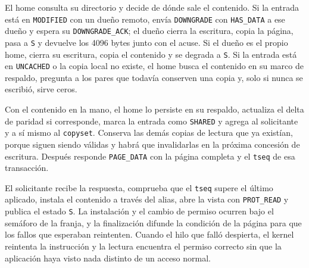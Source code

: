 El home consulta su directorio y decide de dónde sale el contenido. Si la entrada está en \texttt{MODIFIED} con un dueño remoto, envía \texttt{DOWNGRADE} con \texttt{HAS\_DATA} a ese dueño y espera su \texttt{DOWNGRADE\_ACK}; el dueño cierra la escritura, copia la página, pasa a \texttt{S} y devuelve los 4096 bytes junto con el acuse. Si el dueño es el propio home, cierra su escritura, copia el contenido y se degrada a \texttt{S}. Si la entrada está en \texttt{UNCACHED} o la copia local no existe, el home busca el contenido en su marco de respaldo, pregunta a los pares que todavía conserven una copia y, solo si nunca se escribió, sirve ceros.

Con el contenido en la mano, el home lo persiste en su respaldo, actualiza el delta de paridad si corresponde, marca la entrada como \texttt{SHARED} y agrega al solicitante y a sí mismo al \texttt{copyset}. Conserva las demás copias de lectura que ya existían, porque siguen siendo válidas y habrá que invalidarlas en la próxima concesión de escritura. Después responde \texttt{PAGE\_DATA} con la página completa y el \texttt{tseq} de esa transacción.

El solicitante recibe la respuesta, comprueba que el \texttt{tseq} supere el último aplicado, instala el contenido a través del alias, abre la vista con \texttt{PROT\_READ} y publica el estado \texttt{S}. La instalación y el cambio de permiso ocurren bajo el semáforo de la franja, y la finalización difunde la condición de la página para que los fallos que esperaban reintenten. Cuando el hilo que falló despierta, el kernel reintenta la instrucción y la lectura encuentra el permiso correcto sin que la aplicación haya visto nada distinto de un acceso normal.

